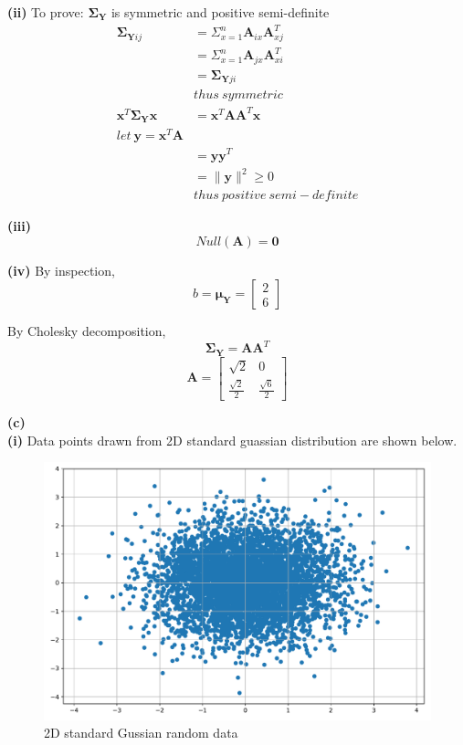 \documentclass[11pt]{article}
\begin{document}
\textbf{(ii)}
To prove: $\pmb{\Sigma}_\textbf{Y}$ is symmetric and positive semi-definite\\
\begin{equation} \label{eq5}
\begin{split}
\pmb{\Sigma}_{\textbf{Y}ij}&=\Sigma_{x=1}^n\textbf{A}_{ix}\textbf{A}^T_{xj}\\
&=\Sigma_{x=1}^n\textbf{A}_{jx}\textbf{A}_{xi}^T\\
&=\pmb{\Sigma}_{\textbf{Y}ji}\\
&thus\ symmetric \\
\textbf{x}^T\pmb{\Sigma}_\textbf{Y}\textbf{x}&=\textbf{x}^T\textbf{AA}^T\textbf{x}\\
let\ \textbf{y}=\textbf{x}^T\textbf{A}\\
&=\textbf{yy}^T\\
&=\|\textbf{y}\|^2 \ge 0\\
&thus\ positive\ semi-definite
\end{split}
\end{equation}

\textbf{(iii)}
$$Null(\textbf{A}) = \textbf{0}$$

\textbf{(iv)}
By inspection,
$$b=\pmb{\mu}_\textbf{Y}=\begin{bmatrix}2\\6\end{bmatrix}$$

By Cholesky decomposition,
$$\pmb{\Sigma}_\textbf{Y}=\textbf{A}\textbf{A}^T$$
$$\textbf{A}=\begin{bmatrix}
\sqrt{2}	&0\\
\frac{\sqrt{2}}{2}	&\frac{\sqrt{6}}{2}
\end{bmatrix}$$
\pagebreak

\noindent\textbf{(c)}\\

\textbf{(i)} Data points drawn from 2D standard guassian distribution are shown below.
\begin{figure}[h]
\centering
\includegraphics[width=0.45\linewidth]{exercise3_c1}
\caption{2D standard Gussian random data}
\label{fig: figure 3.2}
\end{figure}
\end{document}
